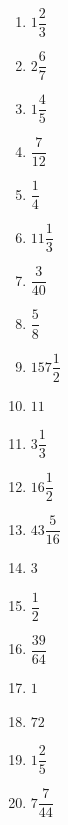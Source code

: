 
\begin{multicols}{5}
\begin{enumerate}[$(1)$]
\item $1\dfrac{2}{3}$
\item $2\dfrac{6}{7}$
\item $1\dfrac{4}{5}$
\item $\dfrac{7}{12}$
\item $\dfrac{1}{4}$
\item $11\dfrac{1}{3}$
\item $\dfrac{3}{40}$
\item $\dfrac{5}{8}$
\item $157\dfrac{1}{2}$
\item $11$
\item $3\dfrac{1}{3}$
\item $16\dfrac{1}{2}$
\item $43\dfrac{5}{16}$
\item $3$
\item $\dfrac{1}{2}$
\item $\dfrac{39}{64}$
\item $1$
\item $72$
\item $1\dfrac{2}{5}$
\item $7\dfrac{7}{44}$
\end{enumerate}
\end{multicols}


